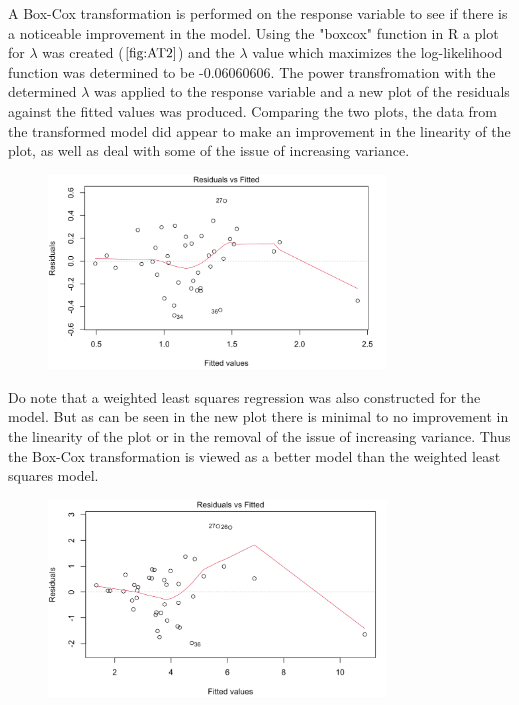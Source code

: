 \documentclass[12pt]{report}
\begin{document}
A Box-Cox transformation is performed on the response variable to see if there is a noticeable improvement in the model. Using the "boxcox" function in R a plot for $\lambda$ was created ($\ref{fig:AT2}$) and the $\lambda$ value which maximizes the log-likelihood function was determined to be -0.06060606. The power transfromation with the determined $\lambda$ was applied to the response variable and a new plot of the residuals against the fitted values was produced. Comparing the two plots, the data from the transformed model did appear to make an improvement in the linearity of the plot, as well as deal with some of the issue of increasing variance.

\begin{figure}[H]
    \centering
    \includegraphics[width=0.8\textwidth]{Adequacy tests/BC plot.png}
\end{figure}
\noindent

Do note that a weighted least squares regression was also constructed for the model. But as can be seen in the new plot there is minimal to no improvement in the linearity of the plot or in the removal of the issue of increasing variance. Thus the Box-Cox transformation is viewed as a better model than the weighted least squares model.

\begin{figure}[H]
    \centering
    \includegraphics[width=0.8\textwidth]{Adequacy tests/WT plot.png}
\end{figure}
\noindent
\end{document}
